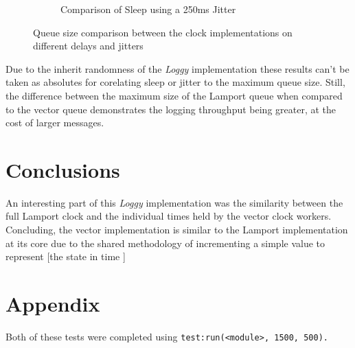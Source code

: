 \documentclass[a4paper, 11pt]{article}
\begin{document}
\begin{figure}[H]
\begin{center}
\begin{subfigure}[b]{0.494\textwidth}
      \caption{Comparison of Sleep using a 250ms Jitter}
      \label{fig:results2}
    \end{subfigure}
  \end{center}
  \caption{Queue size comparison between the clock implementations on different delays and jitters}
  \label{fig:comparison}
\end{figure}

Due to the inherit randomness of the \textit{Loggy} implementation these results can't be taken as absolutes for corelating sleep or jitter to the maximum queue size.
Still, the difference between the maximum size of the Lamport queue when compared to the vector queue demonstrates the logging throughput being greater, at the cost of larger messages.



\section{Conclusions}


An interesting part of this \textit{Loggy} implementation was the similarity between the full Lamport clock and the individual times held by the vector clock workers.
Concluding, the vector implementation is similar to the Lamport implementation at its core due to the shared methodology of incrementing a simple value to represent [the state in time ]




\newpage
\section{Appendix}

Both of these tests were completed using \texttt{test:run(<module>, 1500, 500).}
\end{document}
